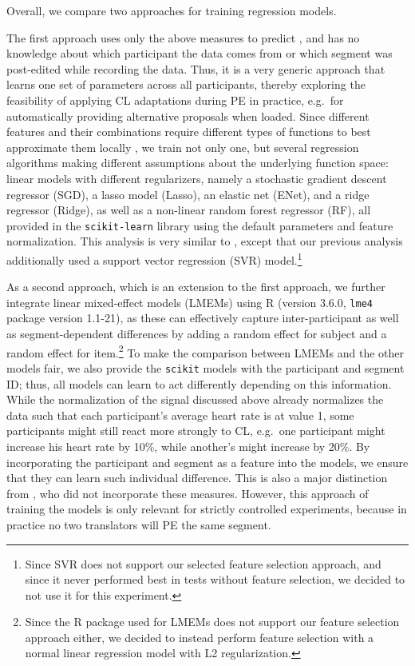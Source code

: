 \documentclass[output=paper]{langsci/langscibook}
\begin{document}
Overall, we compare two approaches for training regression models.

The first approach uses only the above measures to predict \subjCL{}, and has no knowledge about which participant the data comes from or which segment was post-edited while recording the data. Thus, it is a very generic approach that learns one set of parameters across all participants, thereby exploring the feasibility of applying CL adaptations during PE in practice, e.g.\ for automatically providing alternative proposals when loaded.
Since different features and their combinations require different types of functions to best approximate them locally%
, we train not only one, but several regression algorithms making different assumptions about the underlying function space:
linear models with different regularizers, namely a stochastic gradient descent regressor (SGD), a lasso model (Lasso), an elastic net (ENet), and a ridge regressor (Ridge), as well as a non-linear random forest regressor (RF), all provided in the \texttt{scikit-learn} library using the default parameters and feature normalization. This analysis is very similar to \citet{herbig2019mt}, except that our previous analysis additionally used a support vector regression (SVR) model.\footnote{Since SVR does not support our selected feature selection approach, and since it never performed best in tests without feature selection, we decided to not use it for this experiment.}

As a second approach, which is an extension to the first approach, we further integrate linear mixed-effect models (LMEMs) using R (version 3.6.0, \texttt{lme4} package version 1.1-21), as these can effectively capture inter-participant as well as segment-dependent differences by adding a random effect for subject and  a random effect for item.\footnote{Since the R package used for LMEMs does not support our feature selection approach either, we decided to instead perform feature selection with a normal linear regression model with L2 regularization.} To make the comparison between LMEMs and the other models fair, we also provide the \texttt{scikit} models with the participant and segment ID; thus, all models can learn to act differently depending on this information. While the normalization of the signal discussed above already normalizes the data such that each participant's average heart rate is at value 1, some participants might still react more strongly to CL, e.g.\ one participant might increase his heart rate by 10\%, while another's might increase by 20\%. By incorporating the participant and segment as a feature into the models, we ensure that they can learn such individual difference. This is also a major distinction from \citet{herbig2019mt}, who did not incorporate these measures. However, this approach of training the models is only relevant for strictly controlled experiments, because in practice no two translators will PE the same segment.
\end{document}
